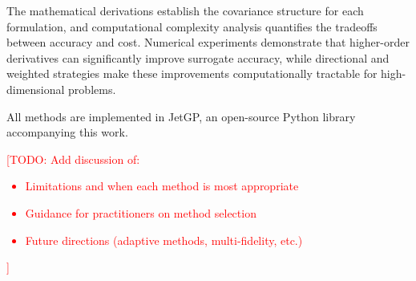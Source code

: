 \documentclass[12pt]{article}
\newcommand{\todo}[1]{\textcolor{red}{[TODO: #1]}}
\begin{document}
The mathematical derivations establish the covariance structure for each formulation, and computational complexity analysis quantifies the tradeoffs between accuracy and cost. Numerical experiments demonstrate that higher-order derivatives can significantly improve surrogate accuracy, while directional and weighted strategies make these improvements computationally tractable for high-dimensional problems.

All methods are implemented in JetGP, an open-source Python library accompanying this work.

\todo{Add discussion of:
	\begin{itemize}
		\item Limitations and when each method is most appropriate
		\item Guidance for practitioners on method selection
		\item Future directions (adaptive methods, multi-fidelity, etc.)
	\end{itemize}
}

	
	
	
	
\end{document}
